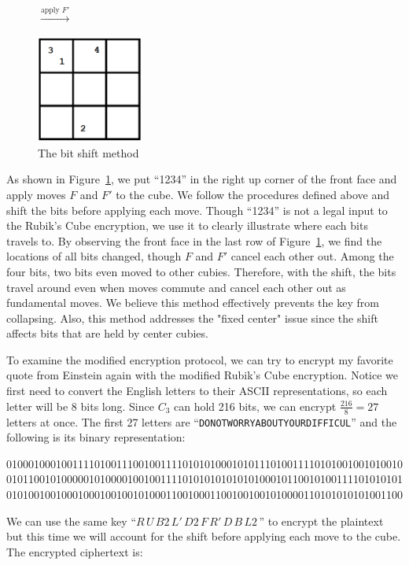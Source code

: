 \begin{figure}[ht]
\begin{minipage}{0.3\textwidth}
    \end{minipage}
    \\ $\xrightarrow{\text{apply }F'}$
    \begin{minipage}{0.3\textwidth}
        \centering
        \includegraphics[width=3.5cm]{figures/encryption/bit_rotate_two.png}
    \end{minipage}
    \caption{The bit shift method}\label{fig:bit-shift}
\end{figure}
As shown in Figure~\ref{fig:bit-shift}, we put ``1234'' in the right up corner of the front face and apply moves $F$ and $F'$ to the cube. We follow the procedures defined above and shift the bits before applying each move. Though ``1234'' is not a legal input to the Rubik's Cube encryption, we use it to clearly illustrate where each bits travels to. By observing the front face in the last row of Figure~\ref{fig:bit-shift}, we find the locations of all bits changed, though $F$ and $F'$ cancel each other out. Among the four bits, two bits even moved to other cubies. Therefore, with the shift, the bits travel around even when moves commute and cancel each other out as fundamental moves. We believe this method effectively prevents the key from collapsing. Also, this method addresses the "fixed center" issue since the shift affects bits that are held by center cubies.
\par To examine the modified encryption protocol, we can try to encrypt my favorite quote from Einstein again with the modified Rubik's Cube encryption. Notice we first need to convert the English letters to their ASCII representations, so each letter will be 8 bits long. Since $C_3$ can hold 216 bits, we can encrypt $\frac{216}{8} = 27$ letters at once. The first 27 letters are ``\texttt{DONOTWORRYABOUTYOURDIFFICUL}'' and the following is its binary representation:
\begin{center}
    010001000100111101001110010011110101010001010111010011110101001001010010
    010110010100000101000010010011110101010101010100010110010100111101010101
    010100100100010001001001010001100100011001001001010000110101010101001100
\end{center}
We can use the same key ``$R\,U\,B2\,L'\,D2\,F\,R'\,D\,B\,L2\,$'' to encrypt the plaintext but this time we will account for the shift before applying each move to the cube. The encrypted ciphertext is:
